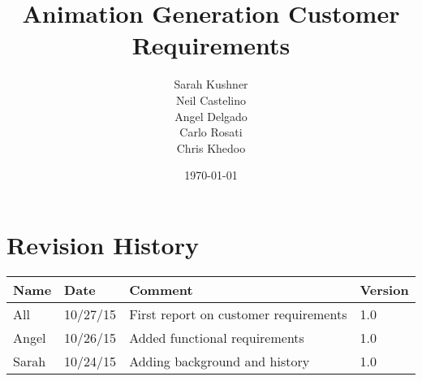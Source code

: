 \documentclass{report}
\begin{document}
\title{Animation Generation Customer Requirements}
\author{Sarah Kushner \\
		Neil Castelino \\
		Angel Delgado \\
		Carlo Rosati \\
		Chris Khedoo}
\date{\today}
\maketitle
\small

\pagebreak
\section{Revision History}
\begin{tabular}{|l|l|l|l|}
\hline
Name	& Date	 		& 	Comment	 								& 	Version	 \\ \hline
All		& 10/27/15		& 	First report on customer requirements	&  	1.0 	 \\ \hline
Angel		& 10/26/15		&	Added functional requirements	&		1.0	 \\ \hline
Sarah		& 10/24/15		& 	Adding background and history	&  	1.0 	 \\ \hline
\end{tabular}

\pagebreak




\end{document}
